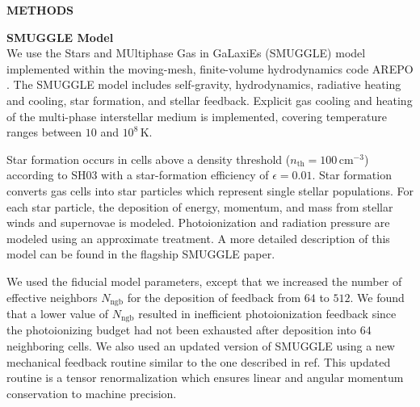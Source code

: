 \documentclass{natureprintstyle}
\begin{document}

\newpage

\setcounter{page}{1}
\setcounter{figure}{0}
\setcounter{table}{0}
\captionsetup[figure]{labelformat=empty}
\renewcommand{\figurename}{Extended Data Figure}
\renewcommand{\thetable}{Extended Data \arabic{table}}

\begin{center}
{\bf \Large \uppercase{Methods} }
\end{center}

\noindent
{\bf SMUGGLE Model}
\\
\noindent
We use the Stars and MUltiphase Gas in GaLaxiEs (SMUGGLE) model
\cite{2019MNRAS.489.4233M} implemented within the moving-mesh, finite-volume
hydrodynamics code AREPO \cite{2010MNRAS.401..791S}. The SMUGGLE model
includes self-gravity, hydrodynamics, radiative heating and cooling, star
formation, and stellar feedback. Explicit gas cooling and heating of the
multi-phase interstellar medium is implemented, covering temperature ranges
between $10$ and $10^8\,\textrm{K}$.

Star formation occurs in cells above a density threshold
($n_{\textrm{th}}=100\,\textrm{cm}^{-3}$) according to SH03 with a
star-formation efficiency of $\epsilon = 0.01$. Star formation converts gas
cells into star particles which represent single stellar populations. For each
star particle, the deposition of energy, momentum, and mass from stellar winds
and supernovae is modeled. Photoionization and radiation pressure are modeled
using an approximate treatment. A more detailed description of this model can
be found in the flagship SMUGGLE paper.\cite{2019MNRAS.489.4233M}

We used the fiducial model parameters, except that we increased the number of
effective neighbors $N_{\textrm{ngb}}$ for the deposition of feedback from
$64$ to $512$. We found that a lower value of $N_{\textrm{ngb}}$ resulted in
inefficient photoionization feedback since the photoionizing budget had not
been exhausted after deposition into $64$ neighboring cells. We also used an
updated version of SMUGGLE using a new mechanical feedback routine similar to
the one described in ref.\cite{2018MNRAS.480..800H} This updated routine is a
tensor renormalization which ensures linear and angular momentum conservation
to machine precision.

\vspace{12pt}
\end{document}
